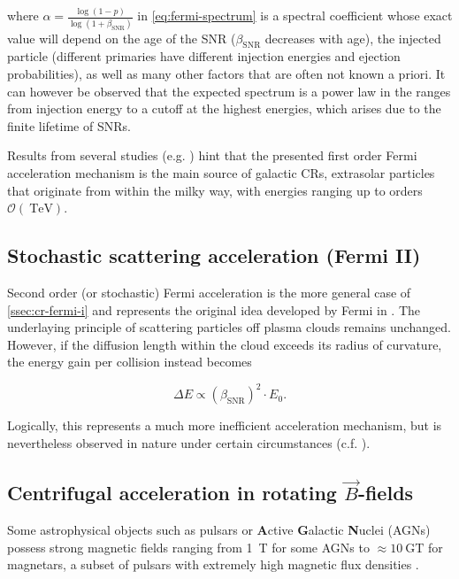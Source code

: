 where $\alpha = \frac{\log(1 - p)}{\log(1 + \beta_\text{SNR})}$ in \autoref{eq:fermi-spectrum} is a spectral coefficient whose exact value will depend on the age 
of the SNR ($\beta_\text{SNR}$ decreases with age), the injected particle (different primaries have different injection energies and ejection probabilities), as 
well as many other factors that are often not known a priori. It can however be observed that the expected spectrum is a power law in the ranges from injection energy 
to a cutoff at the highest energies, which arises due to the finite lifetime of SNRs.

Results from several studies (e.g. \cite{aab2015searches, hillas2005can, blasi2013origin}) hint that the presented first order Fermi acceleration mechanism is the 
main source of galactic CRs, extrasolar particles that originate from within the milky way, with energies ranging up to orders 
$\mathcal{O}(\SI{}{\tera\electronvolt})$.

\subsection{Stochastic scattering acceleration (Fermi II)}
\label{ssec:cr-fermi-ii}

Second order (or stochastic) Fermi acceleration is the more general case of \autoref{ssec:cr-fermi-i} and represents the original idea developed by Fermi in 
\cite{fermi1949origin}. The underlaying principle of scattering particles off plasma clouds remains unchanged. However, if the diffusion length within the cloud 
exceeds its radius of curvature, the energy gain per collision instead becomes

\begin{equation}
\Delta E \propto \left( \beta_\text{SNR}\right)^2 \cdot E_0.
\end{equation}

Logically, this represents a much more inefficient acceleration mechanism, but is nevertheless observed in nature under certain circumstances (c.f. 
\cite{asano2015most}).

\subsection{Centrifugal acceleration in rotating $\vec{B}$-fields}
\label{ssec:cr-centrifugal-acceleration}

Some astrophysical objects such as pulsars or \textbf{A}ctive \textbf{G}alactic \textbf{N}uclei (AGNs) possess strong magnetic fields ranging from \SI{1}{\tesla}
for some AGNs \cite{daly2019black} to $\approx\SI{10}{\giga\tesla}$ for magnetars, a subset of pulsars with extremely high magnetic flux densities 
\cite{flowers1977evolution}.

